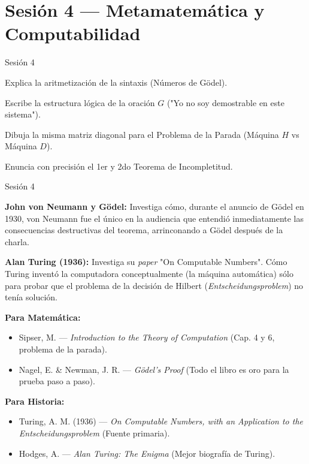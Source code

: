 \documentclass[11pt, letterpaper]{article}
\begin{document}
\newpage

\section{Sesi\'on 4 --- Metamatem\'atica y Computabilidad}

\begin{verificacion}{Sesi\'on 4}
\begin{checklist}
  \item Explica la aritmetizaci\'on de la sintaxis (N\'umeros de G\"odel).
  \item Escribe la estructura l\'ogica de la oraci\'on $G$ ("Yo no soy demostrable en este sistema").
  \item Dibuja la misma matriz diagonal para el Problema de la Parada (M\'aquina $H$ vs M\'aquina $D$).
  \item Enuncia con precisi\'on el 1er y 2do Teorema de Incompletitud.
\end{checklist}
\end{verificacion}

\begin{historia}{Sesi\'on 4}
\begin{checklist}
  \item \textbf{John von Neumann y G\"odel:} Investiga c\'omo, durante el anuncio de G\"odel en 1930, von Neumann fue el \'unico en la audiencia que entendi\'o inmediatamente las consecuencias destructivas del teorema, arrinconando a G\"odel despu\'es de la charla.
  \item \textbf{Alan Turing (1936):} Investiga su \textit{paper} "On Computable Numbers". C\'omo Turing invent\'o la computadora conceptualmente (la m\'aquina autom\'atica) s\'olo para probar que el problema de la decisi\'on de Hilbert (\textit{Entscheidungsproblem}) no ten\'ia soluci\'on.
\end{checklist}
\end{historia}

\begin{referencias}
\textbf{Para Matem\'atica:}
\begin{itemize}
    \item Sipser, M. --- \textit{Introduction to the Theory of Computation} (Cap. 4 y 6, problema de la parada).
    \item Nagel, E. \& Newman, J. R. --- \textit{G\"odel's Proof} (Todo el libro es oro para la prueba paso a paso).
\end{itemize}
\textbf{Para Historia:}
\begin{itemize}
    \item Turing, A. M. (1936) --- \textit{On Computable Numbers, with an Application to the Entscheidungsproblem} (Fuente primaria).
    \item Hodges, A. --- \textit{Alan Turing: The Enigma} (Mejor biograf\'ia de Turing).
\end{itemize}
\end{referencias}
\end{document}
